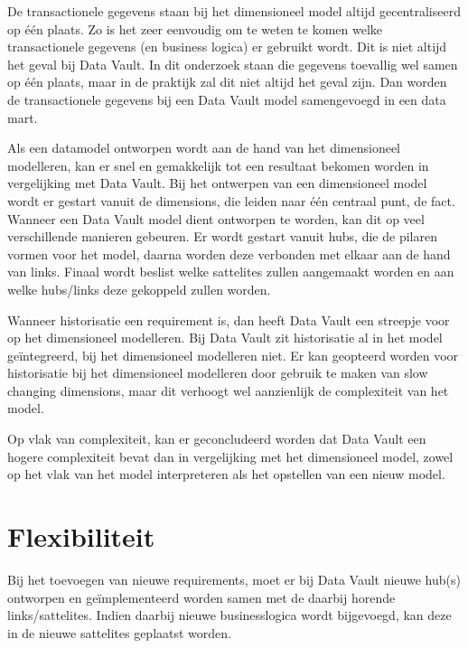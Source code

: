 De transactionele gegevens staan bij het dimensioneel model altijd gecentraliseerd op één plaats. Zo is het zeer eenvoudig om te weten te komen welke transactionele gegevens (en business logica) er gebruikt wordt. Dit is niet altijd het geval bij Data Vault. In dit onderzoek staan die gegevens toevallig wel samen op één plaats, maar in de praktijk zal dit niet altijd het geval zijn. Dan worden de transactionele gegevens bij een Data Vault model samengevoegd in een data mart.

Als een datamodel ontworpen wordt aan de hand van het dimensioneel modelleren, kan er snel en gemakkelijk tot een resultaat bekomen worden in vergelijking met Data Vault. Bij het ontwerpen van een dimensioneel model wordt er gestart vanuit de dimensions, die leiden naar één centraal punt, de fact. Wanneer een Data Vault model dient ontworpen te worden, kan dit op veel verschillende manieren gebeuren. Er wordt gestart vanuit hubs, die de pilaren vormen voor het model, daarna worden deze verbonden met elkaar aan de hand van links. Finaal wordt beslist welke sattelites zullen aangemaakt worden en aan welke hubs/links deze gekoppeld zullen worden.

Wanneer historisatie een requirement is, dan heeft Data Vault een streepje voor op het dimensioneel modelleren. Bij Data Vault zit historisatie al in het model geïntegreerd, bij het dimensioneel modelleren niet. Er kan geopteerd worden voor historisatie bij het dimensioneel modelleren door gebruik te maken van slow changing dimensions, maar dit verhoogt wel aanzienlijk de complexiteit van het model.

Op vlak van complexiteit, kan er geconcludeerd worden dat Data Vault een hogere complexiteit bevat dan in vergelijking met het dimensioneel model, zowel op het vlak van het model interpreteren als het opstellen van een nieuw model.

\section{Flexibiliteit}
Bij het toevoegen van nieuwe requirements, moet er bij Data Vault nieuwe hub(s) ontworpen en geïmplementeerd worden samen met de daarbij horende links/sattelites. Indien daarbij nieuwe businesslogica wordt bijgevoegd, kan deze in de nieuwe sattelites geplaatst worden. 

